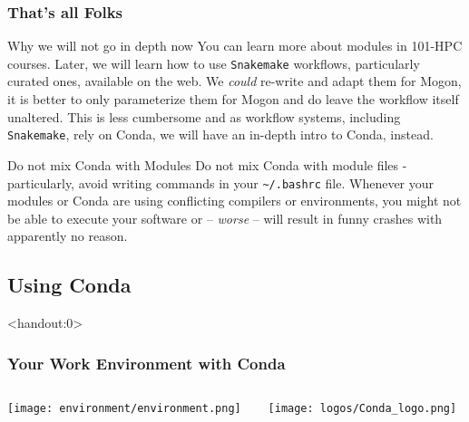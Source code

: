 \begin{frame}[fragile]
  \frametitle{That's all Folks}
   \vspace{-0.8em}
  \begin{alertblock}{Why we will not go in depth now}
You can learn more about modules in 101-HPC courses. Later, we will learn how to use \texttt{Snakemake} workflows, particularly curated ones, available on the web. We \emph{could} re-write and adapt them for Mogon, it is better to only parameterize them for Mogon and do leave the workflow itself unaltered. This is less cumbersome and as workflow systems, including \texttt{Snakemake}, rely on Conda, we will have an in-depth intro to Conda, instead.
  \end{alertblock}
  \vfill
  \begin{alertblock}{Do not mix Conda with Modules}
   Do not mix Conda with module files - particularly, avoid writing  commands in your \texttt{\textasciitilde/.bashrc} file.\newline
   Whenever your modules or Conda are using conflicting compilers or environments, you might not be able to execute your software or -- \emph{worse} -- will result in funny crashes with apparently no reason.
  \end{alertblock}
\end{frame}

\subsection{Using Conda}

\begin{frame}<handout:0> 
  \frametitle{Your Work Environment with Conda}
  \begin{columns}
    \begin{column}{0.5\textwidth}\centering
      \texttt{[image: environment/environment.png]}
    \end{column}
    \begin{column}{0.5\textwidth}\centering
      \texttt{[image: logos/Conda\_logo.png]}   
    \end{column}
  \end{columns}
\end{frame}

